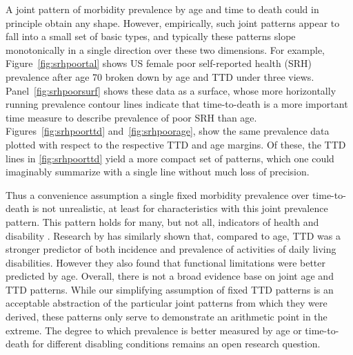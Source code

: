 \documentclass[11pt,oneside,a4paper]{article} %
\begin{document}
 A joint pattern of morbidity prevalence by age and time to death could in
principle obtain any shape. However, empirically, such joint patterns appear to fall into a small set of basic types, and typically these patterns slope monotonically in a single direction over these two dimensions. For example, Figure~\ref{fig:srhpoortal} shows US female poor self-reported health (SRH) prevalence after age 70 broken down by age and TTD under three views. Panel~\ref{fig:srhpoorsurf} shows these data as a surface, whose more horizontally running prevalence contour lines indicate that time-to-death is a more important time measure to describe prevalence of poor SRH than age. Figures~\ref{fig:srhpoorttd} and~\ref{fig:srhpoorage}, show the same prevalence data plotted with respect to the respective TTD and age margins. Of these, the TTD lines in \ref{fig:srhpoorttd} yield a more compact set of patterns, which one could imaginably summarize with a single line without much loss of precision.  

Thus a convenience assumption a single fixed morbidity prevalence over
time-to-death is not unrealistic, at least for characteristics with this joint
prevalence pattern.  This pattern holds for many, but not all, indicators of
health and disability \citep{riffe2015ttd}. Research by
\citet{klijs2010disability} has similarly shown that, compared to age, TTD was a stronger predictor of both incidence and prevalence of activities of daily living disabilities. However they also found that functional limitations were better predicted by age. Overall, there is not a broad evidence base on joint age and TTD patterns. While our simplifying assumption of fixed TTD patterns is an acceptable abstraction of the particular joint patterns from which they were derived, these patterns only serve to demonstrate an arithmetic point in the extreme. The degree to which prevalence is better measured by age or time-to-death for different disabling conditions remains an open research question.
\end{document}
